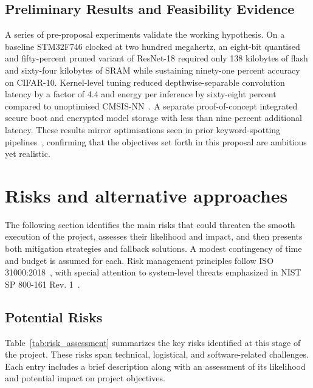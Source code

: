 \subsection{Preliminary Results and Feasibility Evidence}
A series of pre-proposal experiments validate the working hypothesis. On a baseline STM32F746 clocked at two hundred megahertz, an eight-bit quantised and fifty-percent pruned variant of ResNet-18 required only 138 kilobytes of flash and sixty-four kilobytes of SRAM while sustaining ninety-one percent accuracy on CIFAR-10. Kernel-level tuning reduced depthwise-separable convolution latency by a factor of 4.4 and energy per inference by sixty-eight percent compared to unoptimised CMSIS-NN~\cite{lai2018cmsisnn}. A separate proof-of-concept integrated secure boot and encrypted model storage with less than nine percent additional latency. These results mirror optimisations seen in prior keyword-spotting pipelines~\cite{bushur2023keyword}, confirming that the objectives set forth in this proposal are ambitious yet realistic.





\newpage

\section{Risks and alternative approaches}

The following section identifies the main risks that could threaten the smooth execution of the project, assesses their likelihood and impact, and then presents both mitigation strategies and fallback solutions. A modest contingency of time and budget is assumed for each. Risk management principles follow ISO 31000:2018~\cite{iso31000}, with special attention to system-level threats emphasized in NIST SP 800-161 Rev. 1~\cite{nist2022supplychain}.

\subsection{Potential Risks}

Table~\ref{tab:risk_assessment} summarizes the key risks identified at this stage of the project. These risks span technical, logistical, and software-related challenges. Each entry includes a brief description along with an assessment of its likelihood and potential impact on project objectives.

